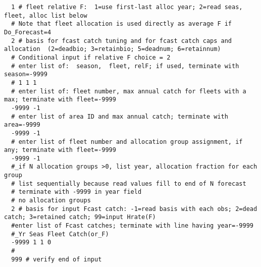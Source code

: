 \begin{landscape}
{\begin{verbatim}
  1 # fleet relative F:  1=use first-last alloc year; 2=read seas, fleet, alloc list below
  # Note that fleet allocation is used directly as average F if Do_Forecast=4 
  2 # basis for fcast catch tuning and for fcast catch caps and allocation  (2=deadbio; 3=retainbio; 5=deadnum; 6=retainnum)
  # Conditional input if relative F choice = 2
  # enter list of:  season,  fleet, relF; if used, terminate with season=-9999
  # 1 1 1
  # enter list of: fleet number, max annual catch for fleets with a max; terminate with fleet=-9999
  -9999 -1
  # enter list of area ID and max annual catch; terminate with area=-9999
  -9999 -1
  # enter list of fleet number and allocation group assignment, if any; terminate with fleet=-9999
  -9999 -1
  #_if N allocation groups >0, list year, allocation fraction for each group 
  # list sequentially because read values fill to end of N forecast
  # terminate with -9999 in year field 
  # no allocation groups
  2 # basis for input Fcast catch: -1=read basis with each obs; 2=dead catch; 3=retained catch; 99=input Hrate(F)
  #enter list of Fcast catches; terminate with line having year=-9999
  #_Yr Seas Fleet Catch(or_F)
  -9999 1 1 0 
  #
  999 # verify end of input  
\end{verbatim}
}




\end{landscape}
